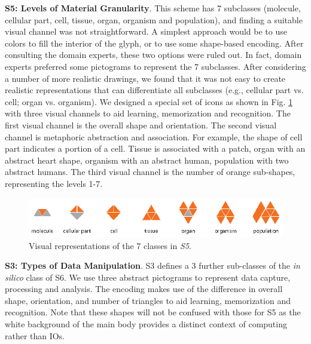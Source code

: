 \textbf{S5: Levels of Material Granularity}.
This scheme has 7 subclasses (molecule, cellular part, cell, tissue, organ, organism and population), and finding a suitable visual channel was not straightforward. A simplest approach would be to use colors to fill the interior of the glyph, or to use some shape-based encoding.
After consulting the domain experts, these two options were ruled out.
In fact, domain experts preferred some pictograms to represent the 7 subclasses.
After considering a number of more realistic drawings, we found that it was not easy to create realistic representations that can differentiate all subclasses (e.g., cellular part vs. cell; organ vs. organism).
We designed a special set of icons as shown in Fig. \ref{fig:s5-metaphor} with three visual channels to aid learning, memorization and recognition.
The first visual channel is the overall shape and orientation.
The second visual channel is metaphoric abstraction and association.
For example, the shape of cell part indicates a portion of a cell.
Tissue is associated with a patch, organ with an abstract heart shape, organism with an abstract human, population with two abstract humans.
The third visual channel is the number of orange sub-shapes, representing the levels 1-7.
\begin{figure}[t!]
\centering
\includegraphics[scale=1]{images/glyph-taxonomy/s5-metaphor.eps}
\caption{Visual representations of the 7 classes in \emph{S5}.}
\label{fig:s5-metaphor}
\vspace{-10pt}
\end{figure}

\textbf{S3: Types of Data Manipulation}.
S3 defines a 3 further sub-classes of the \emph{in silico} class of S6.
We use three abstract pictograms to represent data capture, processing and analysis. The encoding makes use of the difference in overall shape, orientation, and number of triangles to aid learning, memorization and recognition. Note that these shapes will not be confused with those for S5 as the white background of the main body provides a distinct context of computing rather than IOs.

